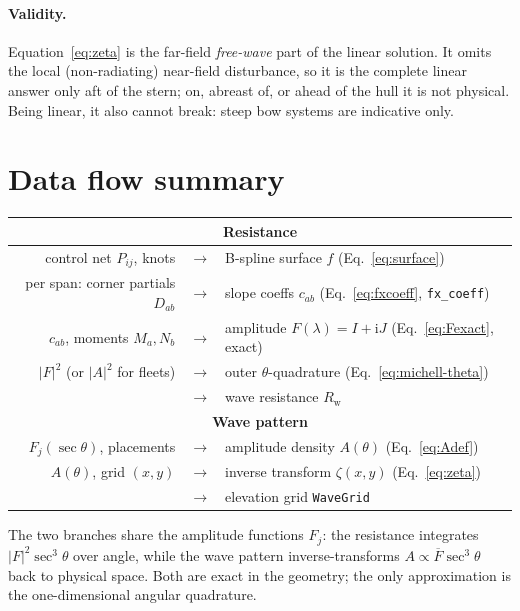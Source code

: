 \documentclass[11pt]{article}
\newcommand{\ii}{\mathrm{i}}
\newcommand{\Rw}{R_{\mathrm{w}}}
\begin{document}
\paragraph{Validity.} Equation~\eqref{eq:zeta} is the far-field \emph{free-wave}
part of the linear solution. It omits the local (non-radiating) near-field
disturbance, so it is the complete linear answer only aft of the stern; on,
abreast of, or ahead of the hull it is not physical. Being linear, it also
cannot break: steep bow systems are indicative only.

\section{Data flow summary}
\label{sec:dataflow}

\begin{center}
\begin{tabular}{r c l}
  \toprule
  \multicolumn{3}{c}{\textbf{Resistance}} \\
  \midrule
  control net $P_{ij}$, knots & $\longrightarrow$ & B-spline surface $f$ (Eq.~\ref{eq:surface}) \\
  per span: corner partials $D_{ab}$ & $\longrightarrow$ & slope coeffs $c_{ab}$ (Eq.~\ref{eq:fxcoeff}, \texttt{fx\_coeff}) \\
  $c_{ab}$, moments $M_a, N_b$ & $\longrightarrow$ & amplitude $F(\lambda) = I + \ii J$ (Eq.~\ref{eq:Fexact}, exact) \\
  $|F|^2$ (or $|A|^2$ for fleets) & $\longrightarrow$ & outer $\theta$-quadrature (Eq.~\ref{eq:michell-theta}) \\
  & $\longrightarrow$ & wave resistance $\Rw$ \\
  \midrule
  \multicolumn{3}{c}{\textbf{Wave pattern}} \\
  \midrule
  $F_j(\sec\theta)$, placements & $\longrightarrow$ & amplitude density $A(\theta)$ (Eq.~\ref{eq:Adef}) \\
  $A(\theta)$, grid $(x,y)$ & $\longrightarrow$ & inverse transform $\zeta(x,y)$ (Eq.~\ref{eq:zeta}) \\
  & $\longrightarrow$ & elevation grid \texttt{WaveGrid} \\
  \bottomrule
\end{tabular}
\end{center}

\noindent The two branches share the amplitude functions $F_j$: the resistance
integrates $|F|^2\sec^3\theta$ over angle, while the wave pattern inverse-transforms
$A \propto \overline{F}\sec^3\theta$ back to physical space. Both are exact in the
geometry; the only approximation is the one-dimensional angular quadrature.
\end{document}
